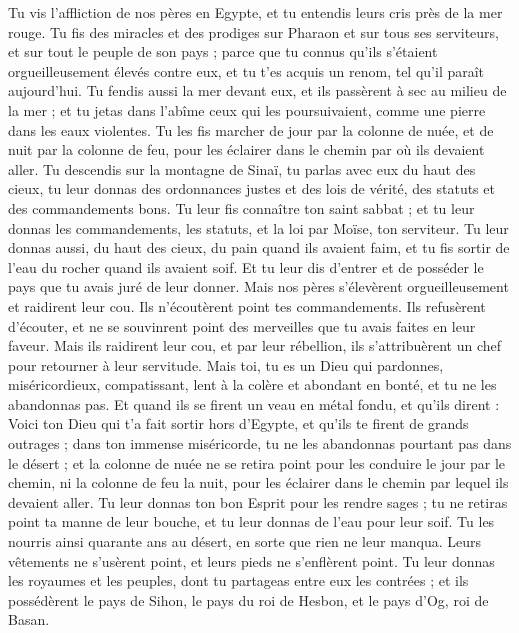 \begin{multicols}{2}
Tu vis l'affliction de nos pères en Egypte, et tu entendis leurs cris près de la mer rouge.
Tu fis des miracles et des prodiges sur Pharaon et sur tous ses serviteurs, et sur tout le peuple de son pays ; parce que tu connus qu'ils s'étaient orgueilleusement élevés contre eux, et tu t'es acquis un renom, tel qu'il paraît aujourd'hui.
Tu fendis aussi la mer devant eux, et ils passèrent à sec au milieu de la mer ; et tu jetas dans l’abîme ceux qui les poursuivaient, comme une pierre dans les eaux violentes.
Tu les fis marcher de jour par la colonne de nuée, et de nuit par la colonne de feu, pour les éclairer dans le chemin par où ils devaient aller.
Tu descendis sur la montagne de Sinaï, tu parlas avec eux du haut des cieux, tu leur donnas des ordonnances justes et des lois de vérité, des statuts et des commandements bons.
Tu leur fis connaître ton saint sabbat ; et tu leur donnas les commandements, les statuts, et la loi par Moïse, ton serviteur.
Tu leur donnas aussi, du haut des cieux, du pain quand ils avaient faim, et tu fis sortir de l'eau du rocher quand ils avaient soif. Et tu leur dis d’entrer et de posséder le pays que tu avais juré de leur donner.
Mais nos pères s’élevèrent orgueilleusement et raidirent leur cou. Ils n’écoutèrent point tes commandements.
Ils refusèrent d'écouter, et ne se souvinrent point des merveilles que tu avais faites en leur faveur. Mais ils raidirent leur cou, et par leur rébellion, ils s'attribuèrent un chef pour retourner à leur servitude. Mais toi, tu es un Dieu qui  pardonnes, miséricordieux, compatissant, lent à la colère et abondant en bonté, et tu ne les abandonnas pas.
Et quand ils se firent un veau en métal fondu, et qu'ils dirent : Voici ton Dieu qui t'a fait sortir hors d'Egypte, et qu'ils te firent de grands outrages ;
dans ton immense miséricorde, tu ne les abandonnas pourtant pas dans le désert ; et la colonne de nuée ne se retira point pour les conduire le jour par le chemin, ni la colonne de feu la nuit, pour les éclairer dans le chemin par lequel ils devaient aller.
Tu leur donnas ton bon Esprit pour les rendre sages ; tu ne retiras point ta manne de leur bouche, et tu leur donnas de l'eau pour leur soif.
Tu les nourris ainsi quarante ans au désert, en sorte que rien ne leur manqua. Leurs vêtements ne s'usèrent point, et leurs pieds ne s'enflèrent point.
Tu leur donnas les royaumes et les peuples, dont tu partageas entre eux les contrées ; et ils possédèrent le pays de Sihon, le pays du roi de Hesbon, et le pays d’Og, roi de Basan.

\end{multicols}

